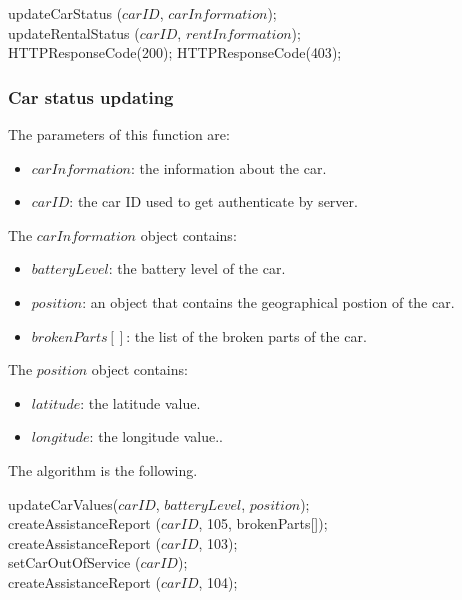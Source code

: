 \bigskip

\begin{algorithm}[H]
\small
	{
		{\color{green} updateCarStatus} ($carID$, $carInformation$); \\
		{
			{\color{green} updateRentalStatus} ($carID$, $rentInformation$); \\
		}
		HTTPResponseCode({\color{red}200});
	}
	{
		HTTPResponseCode({\color{red}403});
	}
\end{algorithm}

\subsubsection{Car status updating}

The parameters of this function are:
\begin{itemize}
	\item $carInformation$: the information about the car.
	\item $carID$: the car ID used to get authenticate by server.
\end{itemize}
The $carInformation$ object contains:
\begin{itemize}
	\item $batteryLevel$: the battery level of the car.
	\item $position$: an object that contains the geographical postion of the car.
	\item $brokenParts[]$: the list of the broken parts of the car.
\end{itemize}
The $position$ object contains:
\begin{itemize}
	\item $latitude$: the latitude value.
	\item $longitude$: the longitude value..
\end{itemize}
The algorithm is the following.

\bigskip

\begin{algorithm}[H]
\small
	{\color{blue} updateCarValues}($carID$, $batteryLevel$, $position$); \\ 
	{
		{
			{\color{blue} createAssistanceReport} ($carID$, {\color{red}105}, brokenParts[]); \\
		} 
	}
	{
		{
			{\color{blue}createAssistanceReport} ($carID$, {\color{red}103}); \\
		} 
	}
	{
		{
			{
				{\color{blue} setCarOutOfService} ($carID$); \\
				{\color{blue} createAssistanceReport} ($carID$, {\color{red}104}); \\
			} 
		}
	}
\end{algorithm}


